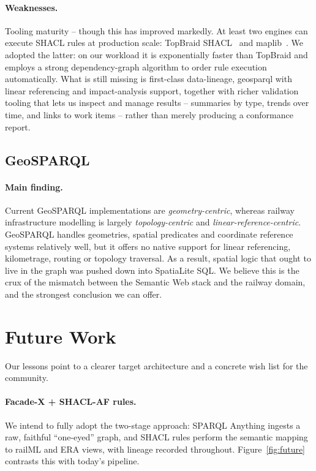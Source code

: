 \documentclass{ceurart}
\begin{document}
\paragraph{Weaknesses.} Tooling maturity -- though this has improved markedly. At
least two engines can execute SHACL rules at production scale: TopBraid
SHACL~\cite{topbraidshacl} and maplib~\cite{maplib}. We adopted the latter: on
our workload it is exponentially faster than TopBraid and employs a strong
dependency-graph algorithm to order rule execution automatically. What is still
missing is first-class data-lineage, geosparql with linear referencing and
impact-analysis support, together with richer validation tooling that lets us inspect 
and manage results -- summaries by type, trends over time, and links to work items -- 
rather than merely producing a conformance report.

\subsection{GeoSPARQL}

\paragraph{Main finding.} Current GeoSPARQL implementations are
\emph{geometry-centric}, whereas railway infrastructure modelling is largely
\emph{topology-centric} and \emph{linear-reference-centric}. GeoSPARQL handles
geometries, spatial predicates and coordinate reference systems relatively well, 
but it offers no native support for linear referencing, kilometrage, routing or
topology traversal. As a result, spatial logic that ought to live in the graph
was pushed down into SpatiaLite SQL. We believe this is the crux of the mismatch
between the Semantic Web stack and the railway domain, and the strongest
conclusion we can offer.

\section{Future Work}
\label{sec:future}

Our lessons point to a clearer target architecture and a concrete wish list for
the community.

\paragraph{Facade-X + SHACL-AF rules.} We intend to fully adopt the two-stage
approach: SPARQL Anything ingests a raw, faithful ``one-eyed'' graph, and SHACL
rules perform the semantic mapping to railML and ERA views, with lineage
recorded throughout. Figure~\ref{fig:future} contrasts this with today's
pipeline.
\end{document}
